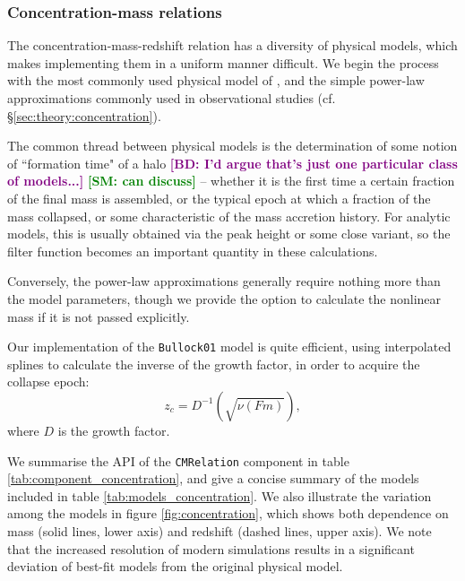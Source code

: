 \documentclass[5p]{elsarticle}
\newcommand{\bd}[1]{\textcolor{purple}{\textbf{[BD: #1]}}}
\newcommand{\sgm}[1]{\textcolor{green}{\textbf{[SM: #1]}}}
\begin{document}
\endgroup




\subsubsection{Concentration-mass relations}
\label{sec:halomod:components:concentration}
The concentration-mass-redshift relation has a diversity of physical models, which makes implementing them in a uniform manner difficult. We begin the process with the most commonly used physical model of \citet{Bullock2001}, and the simple power-law approximations commonly used in observational studies (cf. \S\ref{sec:theory:concentration}).

The common thread between physical models is the determination of some notion of ``formation time" of a halo \bd{I'd argue that's just one particular class of models...} \sgm{can discuss} -- whether it is the first time a certain fraction of the final mass is assembled, or the typical epoch at which a fraction of the mass collapsed, or some characteristic of the mass accretion history. For analytic models, this is usually obtained via the peak height or some close variant, so the filter function becomes an important quantity in these calculations. 

Conversely, the power-law approximations generally require nothing more than the model parameters, though we provide the option to calculate the nonlinear mass if it is not passed explicitly.

Our implementation of the \texttt{Bullock01} model is quite efficient, using interpolated splines to calculate the inverse of the growth factor, in order to acquire the collapse epoch:
\begin{equation}
    \label{eq:zc}
    z_c = D^{-1}(\sqrt{\nu(Fm)}),
\end{equation}
where $D$ is the growth factor.

We summarise the API of the \verb|CMRelation| component in table \ref{tab:component_concentration}, and give a concise summary of the models included in table \ref{tab:models_concentration}. We also illustrate the variation among the models in figure \ref{fig:concentration}, which shows both dependence on mass (solid lines, lower axis) and redshift (dashed lines, upper axis). We note that the increased resolution of modern simulations results in a significant deviation of best-fit models from the original physical model. 
\end{document}
